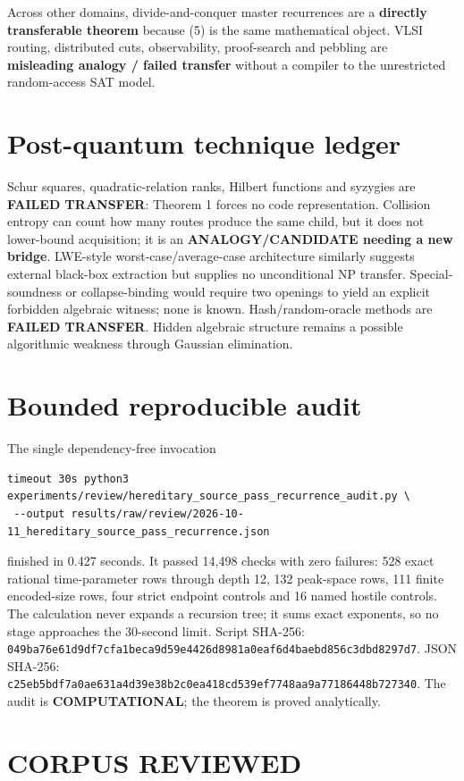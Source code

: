 \documentclass[11pt]{article}
\newcommand{\COMP}{\textbf{COMPUTATIONAL}}
\begin{document}
Across other domains, divide-and-conquer master recurrences are a
\textbf{directly transferable theorem} because (5) is the same mathematical
object.  VLSI routing, distributed cuts, observability, proof-search and
pebbling are \textbf{misleading analogy / failed transfer} without a compiler
to the unrestricted random-access SAT model.

\section{Post-quantum technique ledger}

Schur squares, quadratic-relation ranks, Hilbert functions and syzygies are
\textbf{FAILED TRANSFER}: Theorem 1 forces no code representation.  Collision
entropy can count how many routes produce the same child, but it does not
lower-bound acquisition; it is an \textbf{ANALOGY/CANDIDATE needing a new
bridge}.  LWE-style worst-case/average-case architecture similarly suggests
external black-box extraction but supplies no unconditional NP transfer.
Special-soundness or collapse-binding would require two openings to yield an
explicit forbidden algebraic witness; none is known.  Hash/random-oracle
methods are \textbf{FAILED TRANSFER}.  Hidden algebraic structure remains a
possible algorithmic weakness through Gaussian elimination.

\section{Bounded reproducible audit}

The single dependency-free invocation
\begin{verbatim}
timeout 30s python3 experiments/review/hereditary_source_pass_recurrence_audit.py \
 --output results/raw/review/2026-10-11_hereditary_source_pass_recurrence.json
\end{verbatim}
finished in 0.427 seconds.  It passed 14,498 checks with zero failures: 528
exact rational time-parameter rows through depth 12, 132 peak-space rows,
111 finite encoded-size rows, four strict endpoint controls and 16 named
hostile controls.  The calculation never expands a recursion tree; it sums
exact exponents, so no stage approaches the 30-second limit.  Script SHA-256:
\nolinkurl{049ba76e61d9df7cfa1beca9d59e4426d8981a0eaf6d4baebd856c3dbd8297d7}.
JSON SHA-256:
\nolinkurl{c25eb5bdf7a0ae631a4d39e38b2c0ea418cd539ef7748aa9a77186448b727340}.
The audit is \COMP; the theorem is proved analytically.

\section{CORPUS REVIEWED}
\end{document}
